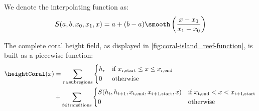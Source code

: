 \documentclass{egpubl}
\begin{document}
We denote the interpolating function as:
\begin{align}
    S(a, b, x_0, x_1, x) = a + (b-a) \smooth\left(\frac{x - x_0}{x_1 - x_0}\right)
\end{align}

The complete coral height field, as displayed in \cref{fig:coral-island_reef-function}, is built as a piecewise function:
\begin{align}
    \heightCoral(x) &= \sum_{r \in \text{subregions}}{
    \begin{dcases}
        h_r & \text{if } x_{\text{r,start}} \leq x \leq x_{\text{r,end}} \\
        0 & \text{otherwise}
    \end{dcases}
    } \nonumber \\ 
    &+
    \sum_{t \in \text{transitions}} {
        \begin{dcases}
            S(h_{t}, h_{t+1}, x_{\text{t,end}}, x_{\text{t+1,start}}, x) & \text{if } x_{\text{t,end}} < x < x_{\text{t+1,start}} \\
            0 & \text{otherwise}
        \end{dcases}
    }
\end{align}





\end{document}
